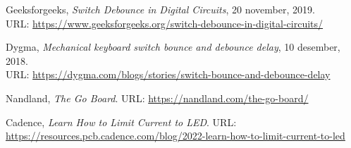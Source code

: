 
  Geeksforgeeks,
  \emph{Switch Debounce in Digital Circuits},
  20 november, 2019. \\
  URL: \url{https://www.geeksforgeeks.org/switch-debounce-in-digital-circuits/}

  Dygma,
  \emph{Mechanical keyboard switch bounce and debounce delay},
  10 desember, 2018. \\
  URL: \url{https://dygma.com/blogs/stories/switch-bounce-and-debounce-delay}

  Nandland,
  \emph{The Go Board}.
  URL: \url{https://nandland.com/the-go-board/}

  Cadence,
  \emph{Learn How to Limit Current to LED}.
  URL: \url{https://resources.pcb.cadence.com/blog/2022-learn-how-to-limit-current-to-led}

